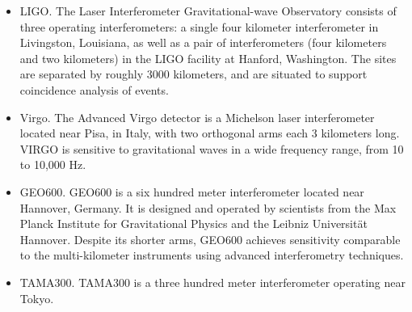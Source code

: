 \documentclass[binding=0.6cm, LaM]{sapthesis}
\begin{document}
		\begin{itemize}
  			\item LIGO. The Laser Interferometer Gravitational-wave Observatory consists of three operating interferometers:
			      a single four kilometer interferometer in Livingston, Louisiana, 
			      as well as a pair of interferometers (four kilometers and two kilometers) in the LIGO facility at Hanford, Washington.
			      The sites are separated by roughly 3000 kilometers, and are situated to support coincidence analysis of events.
  			\item Virgo. The Advanced Virgo detector is a Michelson laser interferometer located near Pisa, 
			      in Italy, with two orthogonal arms each 3 kilometers long. 
			      VIRGO is sensitive to gravitational waves in a wide frequency range, from 10 to 10,000 Hz. 
  			\item GEO600. GEO600 is a six hundred meter interferometer located near Hannover, 
			      Germany. It is designed and operated by scientists from the 
			      Max Planck Institute for Gravitational Physics and the Leibniz Universität Hannover.
 			      Despite its shorter arms, GEO600 achieves sensitivity comparable to 
			      the multi-kilometer instruments using advanced interferometry techniques.
  			\item TAMA300. TAMA300 is a three hundred meter interferometer operating near Tokyo.

\end{itemize}
\end{document}
